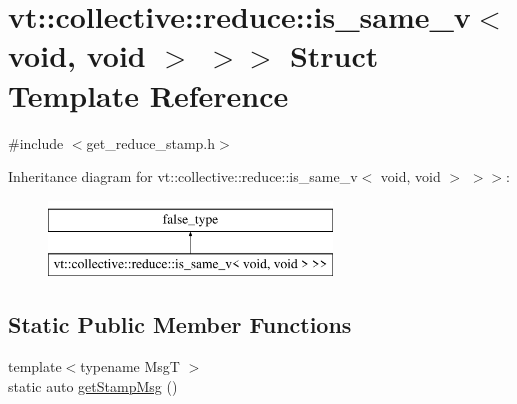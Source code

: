 \hypertarget{structvt_1_1collective_1_1reduce_1_1_get_reduce_stamp_3_01std_1_1enable__if__t_3_01std_1_1is__saac3f8a4cbf86762dde62215be4a56bf0}{}\section{vt\+:\+:collective\+:\+:reduce\+:\+:is\+\_\+same\+\_\+v$<$ void, void $>$ $>$$>$ Struct Template Reference}
\label{structvt_1_1collective_1_1reduce_1_1_get_reduce_stamp_3_01std_1_1enable__if__t_3_01std_1_1is__saac3f8a4cbf86762dde62215be4a56bf0}


{\ttfamily \#include $<$get\+\_\+reduce\+\_\+stamp.\+h$>$}

Inheritance diagram for vt\+:\+:collective\+:\+:reduce\+:\+:is\+\_\+same\+\_\+v$<$ void, void $>$ $>$$>$\+:\begin{figure}[H]
\begin{center}
\leavevmode
\includegraphics[height=2.000000cm]{structvt_1_1collective_1_1reduce_1_1_get_reduce_stamp_3_01std_1_1enable__if__t_3_01std_1_1is__saac3f8a4cbf86762dde62215be4a56bf0}
\end{center}
\end{figure}
\subsection*{Static Public Member Functions}
\begin{DoxyCompactItemize}
\item 
{\footnotesize template$<$typename MsgT $>$ }\\static auto \hyperlink{structvt_1_1collective_1_1reduce_1_1_get_reduce_stamp_3_01std_1_1enable__if__t_3_01std_1_1is__saac3f8a4cbf86762dde62215be4a56bf0_ae0004ff7c4b5255f74354904999e1c03}{get\+Stamp\+Msg} ()
\end{DoxyCompactItemize}


